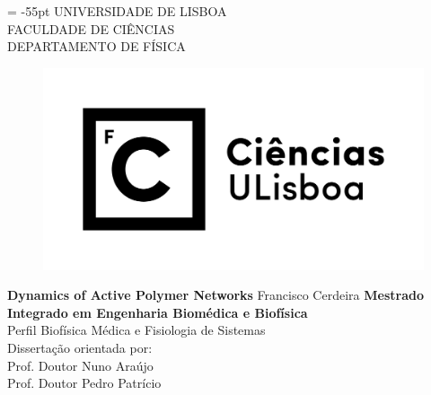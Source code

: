 \documentclass[11pt,a4paper,twoside,openright]{book}
\begin{document}
\begin{sloppy}
%
%
\begin{titlepage}
\topmargin = -55pt
\centering
\Large UNIVERSIDADE DE LISBOA\\
\Large FACULDADE DE CIÊNCIAS\\
\Large DEPARTAMENTO DE FÍSICA\\
\vfill
\begin{figure}[ht!]
\centering
\includegraphics[scale=0.5]{ciencias_ulisboa_marca_horizontal_rgb_preto.png}
\end{figure}
%
\vfill
\textbf{\LARGE Dynamics of Active Polymer Networks}
\vfill
\Large Francisco Cerdeira
\vfill
\textbf{\Large Mestrado Integrado em Engenharia Biomédica e Biofísica}\\
Perfil Biofísica Médica e Fisiologia de Sistemas\\
\vspace{0.8cm}
\vspace{0.8cm}
\Large Dissertação orientada por:\\
\Large Prof. Doutor Nuno Araújo\\
\Large Prof. Doutor Pedro Patrício\\
\vfill
\Large \the\year\\
\end{titlepage}


%
%
\clearpage \thispagestyle{empty}\mbox{}\clearpage
{}



\end{sloppy}
\end{document}
